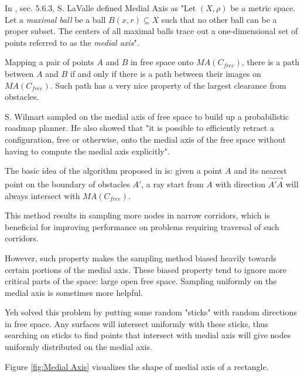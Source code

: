 \documentclass[11pt]{article}
\begin{document}
\indent In \cite{Book}, sec. 5.6.3, S. LaValle defined Medial Axis as "Let $(X, \rho)$ be a metric space. Let a \emph{maximal ball} be a ball $B(x,r) \subseteq X$ such that no other ball can be a proper subset. The centers of all maximal balls trace out a one-dimensional set of points referred to as the \emph{medial axis}".

\indent Mapping a pair of points $A$ and $B$ in free space onto $MA(C_{free})$, there is a path between $A$ and $B$ if and only if there is a path between their images on $MA(C_{free})$. Such path has a very nice property of the largest clearance from obstacles.

\indent S. Wilmart \cite{MAPRM} sampled on the medial axis of free space to build up a probabilistic roadmap planner. He also showed that "it is possible to efficiently retract a configuration, free or otherwise, onto the medial axis of the free space without having to compute the medial axis explicitly".

\indent The basic idea of the algorithm proposed in \cite{MAPRM} is: given a point $A$ and its nearest point on the boundary of obstacles $A'$, a ray start from $A$ with direction $\overrightarrow{A'A}$ will always intersect with $MA(C_{free})$.

\indent This method results in sampling more nodes in narrow corridors, which is beneficial for improving performance on problems requiring traversal of such corridors.

\indent However, such property makes the sampling method biased heavily towards certain portions of the medial axis. These biased property tend to ignore more critical parts of the space: large open free space. Sampling uniformly on the medial axis is sometimes more helpful.

\indent Yeh \cite{UMAPRM} solved this problem by putting some random "sticks" with random directions in free space. Any surfaces will intersect uniformly with these sticks, thus searching on sticks to find points that intersect with medial axis will give nodes uniformly distributed on the medial axis.

\indent Figure \ref{fig:Medial Axis} visualizes the shape of medial axis of a rectangle.
\end{document}

